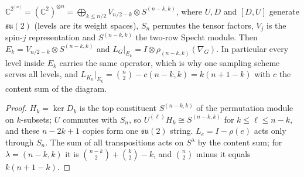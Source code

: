 \begin{proposition}\label{prop:schurweyl}
$\mathbb C^{2^{[n]}}=(\mathbb C^2)^{\otimes n}=\bigoplus_{k\le n/2}V_{n/2-k}\otimes S^{(n-k,k)}$, where $U,D$ and $[D,U]$ generate $\mathfrak{su}(2)$ (levels are its weight
spaces), $S_n$ permutes the tensor factors, $V_j$ is the spin-$j$ representation and $S^{(n-k,k)}$ the two-row Specht module. Then
$E_k=V_{n/2-k}\otimes S^{(n-k,k)}$ and $L_G|_{E_k}=I\otimes\rho_{(n-k,k)}(\nabla_G)$. In particular every level inside $E_k$ carries the same operator, which is
why one sampling scheme serves all levels, and $L_{K_n}|_{E_k}=\binom n2-c(n-k,k)=k(n+1-k)$ with $c$ the content sum of the diagram.
\end{proposition}
\begin{proof}
$H_k=\ker D_k$ is the top constituent $S^{(n-k,k)}$ of the permutation module on $k$-subsets; $U$ commutes with $S_n$, so $U^{(\ell)}H_k\cong S^{(n-k,k)}$ for
$k\le\ell\le n-k$, and these $n-2k+1$ copies form one $\mathfrak{su}(2)$ string. $L_e=I-\rho(e)$ acts only through $S_n$. The sum of all transpositions acts on
$S^\lambda$ by the content sum; for $\lambda=(n-k,k)$ it is $\binom{n-k}2+\binom k2-k$, and $\binom n2$ minus it equals $k(n+1-k)$.
\end{proof}

